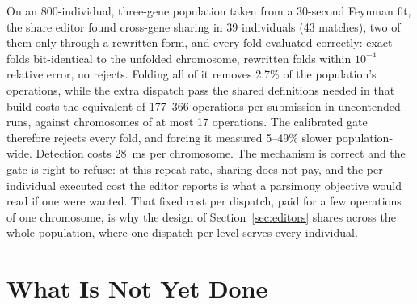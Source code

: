 \documentclass[sigconf,nonacm]{acmart}
\begin{document}
On an 800-individual, three-gene population taken from a 30-second Feynman fit,
the share editor found cross-gene sharing in 39 individuals (43 matches), two of
them only through a rewritten form, and every fold evaluated correctly: exact
folds bit-identical to the unfolded chromosome, rewritten folds within
$10^{-4}$ relative error, no rejects. Folding all of it removes 2.7\% of the
population's operations, while the extra dispatch pass the shared definitions
needed in that build costs the equivalent of
177--366 operations per submission in uncontended runs, against chromosomes of
at most 17 operations.
The calibrated gate therefore rejects every fold, and forcing it measured
5--49\% slower population-wide. Detection costs 28~ms per chromosome. The
mechanism is correct and the gate is right to refuse: at this repeat rate, sharing does
not pay, and the per-individual executed cost the editor reports is what a
parsimony objective would read if one were wanted. That fixed cost per dispatch,
paid for a few operations of one chromosome, is why the design of
Section~\ref{sec:editors} shares across the whole population, where one dispatch
per level serves every individual.

\section{What Is Not Yet Done}
\label{sec:limits}
\end{document}
